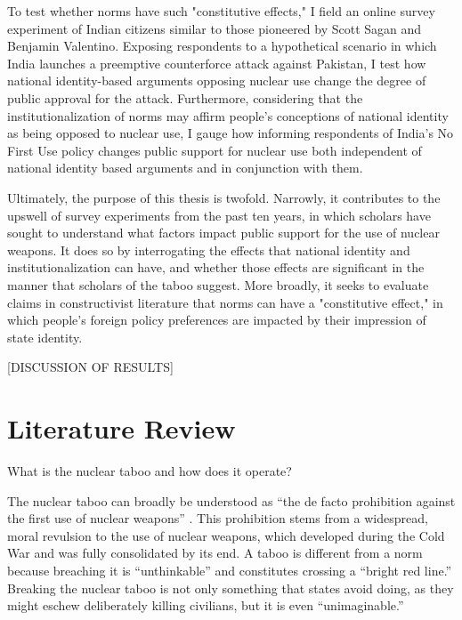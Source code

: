 \documentclass[12pt]{article}
\begin{document}
To test whether norms have such "constitutive effects," I field an online survey experiment of Indian citizens similar to those pioneered by Scott Sagan and Benjamin Valentino. Exposing respondents to a hypothetical scenario in which India launches a preemptive counterforce attack against Pakistan, I test how national identity-based arguments opposing nuclear use change the degree of public approval for the attack. Furthermore, considering that the institutionalization of norms may affirm people's conceptions of national identity as being opposed to nuclear use, I gauge how informing respondents of India's No First Use policy changes public support for nuclear use both independent of national identity based arguments and in conjunction with them.

Ultimately, the purpose of this thesis is twofold. Narrowly, it contributes to the upswell of survey experiments from the past ten years, in which scholars have sought to understand what factors impact public support for the use of nuclear weapons. It does so by interrogating the effects that national identity and institutionalization can have, and whether those effects are significant in the manner that scholars of the taboo suggest. More broadly, it seeks to evaluate claims in constructivist literature that norms can have a "constitutive effect," in which people's foreign policy preferences are impacted by their impression of state identity.

[DISCUSSION OF RESULTS]

\section{Literature Review}

What is the nuclear taboo and how does it operate? 

The nuclear taboo can broadly be understood as ``the de facto prohibition against the first use of nuclear weapons'' \citep[10]{tannewald_nuclear_2007}. This prohibition stems from a widespread, moral revulsion to the use of nuclear weapons, which developed during the Cold War and was fully consolidated by its end. A taboo is different from a norm because breaching it is ``unthinkable'' and constitutes crossing a ``bright red line.'' Breaking the nuclear taboo is not only something that states avoid doing, as they might eschew deliberately killing civilians, but it is even ``unimaginable.''
\end{document}

